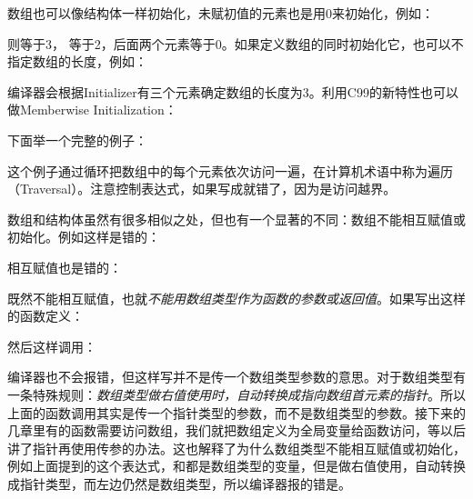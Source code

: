 数组也可以像结构体一样初始化，未赋初值的元素也是用0来初始化，例如：




则等于3， 等于2，后面两个元素等于0。如果定义数组的同时初始化它，也可以不指定数组的长度，例如：




编译器会根据Initializer有三个元素确定数组的长度为3。利用C99的新特性也可以做Memberwise Initialization：




下面举一个完整的例子：





这个例子通过循环把数组中的每个元素依次访问一遍，在计算机术语中称为遍历（Traversal）。注意控制表达式，如果写成就错了，因为是访问越界。



数组和结构体虽然有很多相似之处，但也有一个显著的不同：数组不能相互赋值或初始化。例如这样是错的：




相互赋值也是错的：




既然不能相互赋值，也就\emph{不能用数组类型作为函数的参数或返回值}。如果写出这样的函数定义：




然后这样调用：




编译器也不会报错，但这样写并不是传一个数组类型参数的意思。对于数组类型有一条特殊规则：\emph{数组类型做右值使用时，自动转换成指向数组首元素的指针}。所以上面的函数调用其实是传一个指针类型的参数，而不是数组类型的参数。接下来的几章里有的函数需要访问数组，我们就把数组定义为全局变量给函数访问，等以后讲了指针再使用传参的办法。这也解释了为什么数组类型不能相互赋值或初始化，例如上面提到的这个表达式，和都是数组类型的变量，但是做右值使用，自动转换成指针类型，而左边仍然是数组类型，所以编译器报的错是。



